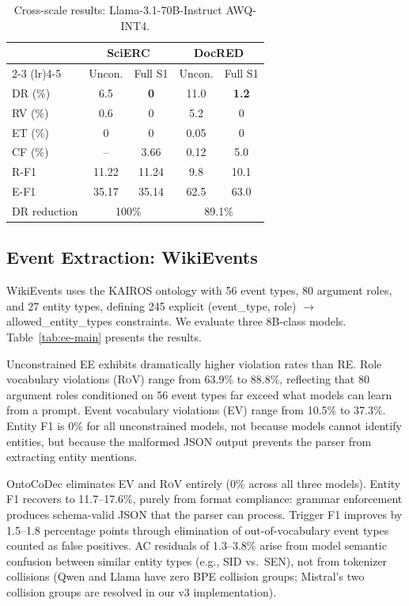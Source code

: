 \documentclass[11pt,a4paper]{article}
\newcommand{\ours}{OntoCoDec}
\newcommand{\drsym}{\textsc{DR}}
\newcommand{\rvsym}{\textsc{RV}}
\newcommand{\etsym}{\textsc{ET}}
\newcommand{\cfsym}{\textsc{CF}}
\newcommand{\evsym}{\textsc{EV}}
\newcommand{\rovsym}{\textsc{RoV}}
\newcommand{\acsym}{\textsc{AC}}
\begin{document}
\begin{table}[t]
\centering
\caption{Cross-scale results: Llama-3.1-70B-Instruct AWQ-INT4.}
\label{tab:scale70b}
\small
\begin{tabular}{lcccc}
\toprule
& \multicolumn{2}{c}{\textbf{SciERC}} & \multicolumn{2}{c}{\textbf{DocRED}} \\
\cmidrule(lr){2-3} \cmidrule(lr){4-5}
& Uncon. & Full S1 & Uncon. & Full S1 \\
\midrule
\drsym{} (\%) & 6.5 & \textbf{0} & 11.0 & \textbf{1.2} \\
\rvsym{} (\%) & 0.6 & 0 & 5.2 & 0 \\
\etsym{} (\%) & 0 & 0 & 0.05 & 0 \\
\cfsym{} (\%) & -- & 3.66 & 0.12 & 5.0 \\
\midrule
R-F1 & 11.22 & 11.24 & 9.8 & 10.1 \\
E-F1 & 35.17 & 35.14 & 62.5 & 63.0 \\
\midrule
DR reduction & \multicolumn{2}{c}{100\%} & \multicolumn{2}{c}{89.1\%} \\
\bottomrule
\end{tabular}
\end{table}

\subsection{Event Extraction: WikiEvents}
\label{sec:ee}

WikiEvents uses the KAIROS ontology with 56 event types, 80 argument roles, and 27 entity types, defining 245 explicit (event\_type, role) $\to$ allowed\_entity\_types constraints. We evaluate three 8B-class models. Table~\ref{tab:ee-main} presents the results.

Unconstrained EE exhibits dramatically higher violation rates than RE. Role vocabulary violations (\rovsym{}) range from 63.9\% to 88.8\%, reflecting that 80 argument roles conditioned on 56 event types far exceed what models can learn from a prompt. Event vocabulary violations (\evsym{}) range from 10.5\% to 37.3\%. Entity F1 is 0\% for all unconstrained models, not because models cannot identify entities, but because the malformed JSON output prevents the parser from extracting entity mentions.

\ours{} eliminates \evsym{} and \rovsym{} entirely (0\% across all three models). Entity F1 recovers to 11.7--17.6\%, purely from format compliance: grammar enforcement produces schema-valid JSON that the parser can process. Trigger F1 improves by 1.5--1.8 percentage points through elimination of out-of-vocabulary event types counted as false positives. \acsym{} residuals of 1.3--3.8\% arise from model semantic confusion between similar entity types (e.g., SID vs.\ SEN), not from tokenizer collisions (Qwen and Llama have zero BPE collision groups; Mistral's two collision groups are resolved in our v3 implementation).
\end{document}
